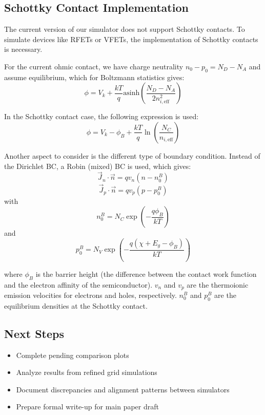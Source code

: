 \documentclass{article}
\begin{document}
\subsection{Schottky Contact Implementation}
The current version of our simulator does not support Schottky contacts. To simulate devices like RFETs or VFETs, the implementation of Schottky contacts is necessary.

For the current ohmic contact, we have charge neutrality $n_0-p_0 = N_D - N_A$ and assume equilibrium, which for Boltzmann statistics gives:
\begin{equation}
\phi = V_k + \frac{kT}{q} \text{asinh} \left( \frac{N_D - N_A}{2 n^2_{i,\text{eff}}} \right)
\end{equation}

In the Schottky contact case, the following expression is used:
\begin{equation}
\phi = V_k - \phi_B + \frac{kT}{q} \ln \left( \frac{N_C}{n_{i,\text{eff}}} \right)
\end{equation}

Another aspect to consider is the different type of boundary condition. Instead of the Dirichlet BC, a Robin (mixed) BC is used, which gives:
\begin{equation}
\vec{J}_n \cdot \vec{n} = q v_n (n-n^B_0)
\end{equation}
\begin{equation}
\vec{J}_p \cdot \vec{n} = q v_p (p-p^B_0)
\end{equation}
with
\begin{equation}
n^B_0 = N_C \exp\left(-\frac{q\phi_B}{kT}\right)
\end{equation}
and 
\begin{equation}
p^B_0 = N_V \exp\left(-\frac{q(\chi + E_g - \phi_B)}{kT}\right)
\end{equation}

where $\phi_B$ is the barrier height (the difference between the contact work function and the electron affinity of the semiconductor). $v_n$ and $v_p$ are the thermoionic emission velocities for electrons and holes, respectively. $n^B_0$ and $p^B_0$ are the equilibrium densities at the Schottky contact.



\subsection{Next Steps}
\begin{itemize}
    \item Complete pending comparison plots
    \item Analyze results from refined grid simulations
    \item Document discrepancies and alignment patterns between simulators
    \item Prepare formal write-up for main paper draft
\end{itemize}
\end{document}
